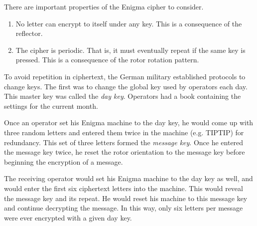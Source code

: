 \documentclass{book}
\theoremstyle{plain}
\theoremstyle{definition}
\begin{document}
There are important properties of the Enigma cipher to consider.
\begin{enumerate}
\item No letter can encrypt to itself under any key. This is a consequence of the reflector.
\item The cipher is periodic. That is, it must eventually repeat if the same key is pressed. This is a consequence of the rotor rotation pattern.
\end{enumerate}

To avoid repetition in ciphertext, the German military established protocols to change keys. The first was to change the global key used by operators each day. This master key was called the {\it day key}. Operators had a book containing the settings for the current month.

Once an operator set his Enigma machine to the day key, he would come up with three random letters and entered them twice in the machine (e.g. TIPTIP) for redundancy. This set of three letters formed the {\it message key}. Once he entered the message key twice, he reset the rotor orientation to the message key before beginning the encryption of a message.

The receiving operator would set his Enigma machine to the day key as well, and would enter the first six ciphertext letters into the machine. This would reveal the message key and its repeat. He would reset his machine to this message key and continue decrypting the message. In this way, only six letters per message were ever encrypted with a given day key.
\end{document}
